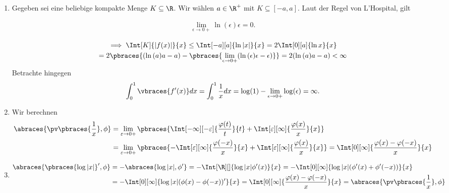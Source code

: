 
\begin{solution}

\phantom{}

\begin{enumerate}[label = (\roman*)]

    \item Gegeben sei eine beliebige kompakte Menge $K \subseteq \R$.
    Wir wählen $a \in \R^+$ mit $K \subseteq [-a, a]$.
    Laut der Regel von L'Hospital, gilt

    \begin{align*}
        \lim_{\epsilon \to 0+}
        \ln{(\epsilon)} \epsilon = 0.
    \end{align*}

    \begin{multline*}
        \implies
        \Int[K]{|f(x)|}{x}
        \leq
        \Int[-a][a]{\ln{|x|}}{x}
        =
        2 \Int[0][a]{\ln{x}}{x} \\
        =
        2 \pbraces
        {
            (\ln{(a)} a - a)
            -
            \pbraces
            {
                \lim_{\epsilon \to 0+}
                (\ln{(\epsilon)} \epsilon - \epsilon)
            }
        }
        =
        2 (\ln{(a)} a - a) < \infty
	\end{multline*}
	Betrachte hingegen 
	\begin{align*}
	\int_0^1 \vbraces{f^\prime(x)} dx = \int_0^1 \frac{1}{x} dx = \log(1) - \lim_{\epsilon \to 0+} \log(\epsilon) = \infty.
	\end{align*}
	\item Wir berechnen
	\begin{align*}
	\abraces{\pv\pbraces{\frac{1}{x}}, \phi} &= \lim_{\varepsilon \to 0+}
	\pbraces
	{
		\Int[-\infty][-\varepsilon]
		{
			\frac{\varphi(t)}{t}
		}{t}
		+
		\Int[\varepsilon][\infty]
		{
			\frac{\varphi(x)}{x}
		}{x}
	} \\
	&= \lim_{\varepsilon \to 0+}
	\pbraces
	{
	-\Int[\varepsilon][\infty]
	{
		\frac{\varphi(-x)}{x}
	}{x}
	+
	\Int[\varepsilon][\infty]
	{
		\frac{\varphi(x)}{x}
	}{x}
	} = \Int[0][\infty]{\frac{\varphi(x) - \varphi(-x)}{x}}{x}
	\end{align*}
	\item 
	\begin{align*}
	\abraces{\pbraces{\log|x|}^\prime, \phi} &= -\abraces{\log|x|, \phi^\prime} = -\Int[\R][]{\log|x| \phi^\prime(x)}{x} = -\Int[0][\infty]{\log|x| (\phi^\prime(x) + \phi^\prime(-x))}{x} \\
	&= -\Int[0][\infty]{\log|x| (\phi(x) - \phi(-x))^\prime}{x} = \Int[0][\infty]{\frac{\varphi(x) - \varphi(-x)}{x}}{x} = \abraces{\pv\pbraces{\frac{1}{x}}, \phi}
	\end{align*}
\end{enumerate}

\end{solution}

